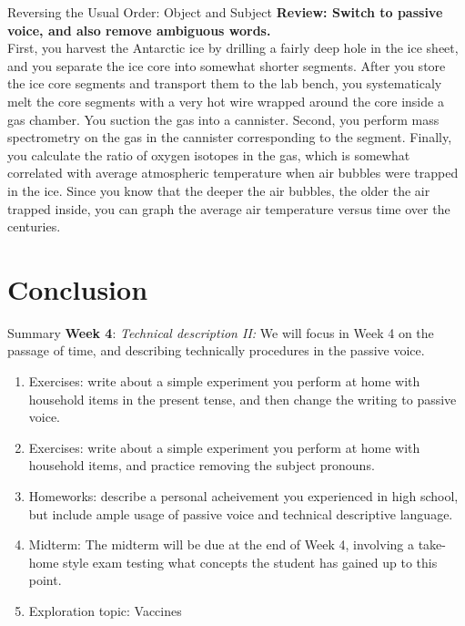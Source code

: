 \documentclass{beamer}
\begin{document}
\begin{frame}{Reversing the Usual Order: Object and Subject}
\small
\textbf{Review: Switch to passive voice, and also remove ambiguous words.} \\
First, you harvest the Antarctic ice by drilling a fairly deep hole in the ice sheet, and you separate the ice core into somewhat shorter segments.  After you store the ice core segments and transport them to the lab bench, you systematicaly melt the core segments with a very hot wire wrapped around the core inside a gas chamber.  You suction the gas into a cannister.  Second, you perform mass spectrometry on the gas in the cannister corresponding to the segment.  Finally, you calculate the ratio of oxygen isotopes in the gas, which is somewhat correlated with average atmospheric temperature when air bubbles were trapped in the ice.  Since you know that the deeper the air bubbles, the older the air trapped inside, you can graph the average air temperature versus time over the centuries.
\end{frame}

\section{Conclusion}

\begin{frame}{Summary}
\small
\textbf{Week 4}: \textit{Technical description II:} We will focus in Week 4 on the passage of time, and describing technically
procedures in the passive voice.
\begin{enumerate}
\item Exercises: write about a simple experiment you perform at home with household items in the present tense, and then change the writing to passive voice.
\item Exercises: write about a simple experiment you perform at home with household items, and practice removing the subject pronouns.
\item Homeworks: describe a personal acheivement you experienced in high school, but include ample usage of
passive voice and technical descriptive language.
\item Midterm: The midterm will be due at the end of Week 4, involving a take-home style exam testing what concepts the student has gained up to this point.
\item Exploration topic: Vaccines
\end{enumerate}
\end{frame}
\end{document}
